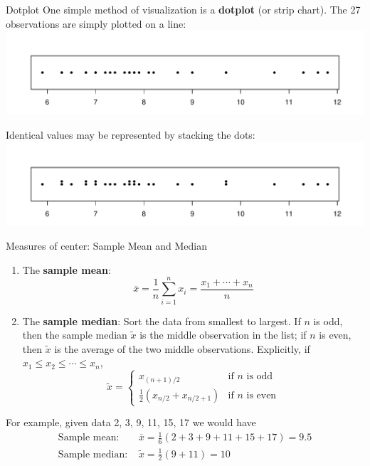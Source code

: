 \documentclass{beamer}
\renewcommand{\emph}{\textbf}
\begin{document}
\begin{frame}{Dotplot}
One simple method of visualization is a \emph{dotplot} (or strip chart). The 27 observations are simply plotted on a line:
\includegraphics[scale=.5]{ch01_strength_dot.pdf}

\pause
Identical values may be represented by stacking the dots:
\includegraphics[scale=.5]{ch01_strength_dot_stack.pdf}
\end{frame}

\begin{frame}{Measures of center: Sample Mean and Median}
\begin{enumerate}
\item The \emph{sample mean}: $$\overline{x} = \frac1n\sum_{i=1}^n x_i = \frac{x_1+\cdots+x_n}n$$
\pause
\item The \emph{sample median}: Sort the data from smallest to largest. If $n$ is odd, then the sample median $\tilde{x}$ is the middle observation in the list; if $n$ is even, then $\tilde{x}$ is the average of the two middle observations. Explicitly, if $x_1 \leq x_2 \leq \cdots \leq x_n$, 
$$\tilde{x} = \begin{cases}
x_{(n+1)/2} & \text{if $n$ is odd} \\
\frac12(x_{n/2} +x_{n/2+1}) & \text{if $n$ is even}
\end{cases}$$
\end{enumerate}
\pause
For example, given data 2, 3, 9, 11, 15, 17 we would have
\begin{align*}
\text{Sample mean: } &\overline{x}=\frac16(2+3+9+11+15+17)=9.5\\
\text{Sample median: }& \tilde{x}=\frac12(9+11)=10
\end{align*}
\end{frame}
\end{document}
